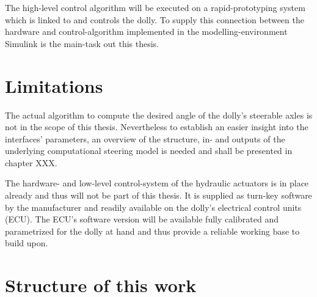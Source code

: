 \documentclass[ExampleMasters.tex]{subfiles}
\begin{document}
The high-level control algorithm will be executed on a rapid-prototyping system which is linked to and controls the dolly. To supply this connection between the hardware and control-algorithm implemented in the modelling-environment Simulink is the main-task out this thesis.   

\section{Limitations}
\label{sec:limitations}
The actual algorithm to compute the desired angle of the dolly's steerable axles is not in the scope of this thesis. Nevertheless to establish an easier insight into the interfaces' parameters, an overview of the structure, in- and outputs of the underlying computational steering model is needed and shall be presented in chapter XXX. 

The hardware- and low-level control-system of the hydraulic actuators is in place already and thus will not be part of this thesis. It is supplied as turn-key software by the manufacturer and readily available on the dolly's electrical control units (ECU). The ECU's software version will be available fully calibrated and parametrized for the dolly at hand and thus provide a reliable working base to build upon. 


\section{Structure of this work}
\label{sec:structure}
\end{document}
